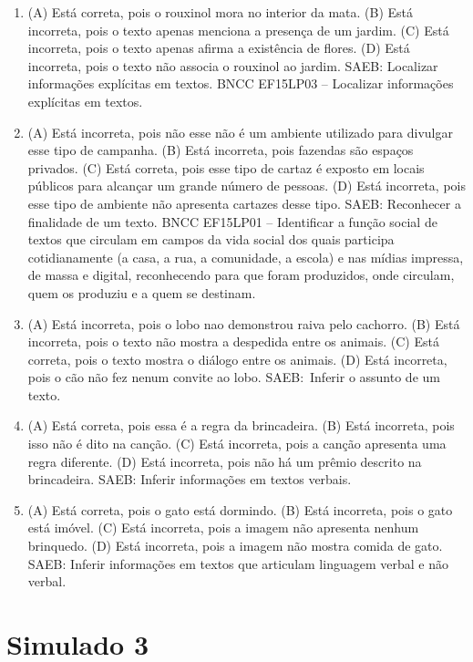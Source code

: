 \begin{enumerate}
\item
(A) Está correta, pois o rouxinol mora no interior da mata.
(B) Está incorreta, pois o texto apenas menciona a presença de um jardim.
(C) Está incorreta, pois o texto apenas afirma a existência de flores.
(D) Está incorreta, pois o texto não associa o rouxinol ao jardim.
SAEB: Localizar informações explícitas em textos.
BNCC EF15LP03 -- Localizar informações explícitas em textos.

\item
(A) Está incorreta, pois não esse não é um ambiente utilizado para divulgar esse tipo de campanha.
(B) Está incorreta, pois fazendas são espaços privados.
(C) Está correta, pois esse tipo de cartaz é exposto em locais
públicos para alcançar um grande número de pessoas.
(D) Está incorreta, pois esse tipo de ambiente não apresenta cartazes desse tipo.
SAEB: Reconhecer a finalidade de um texto.
BNCC EF15LP01 -- Identificar a função social de textos que circulam em
campos da vida social dos quais participa cotidianamente (a casa, a rua,
a comunidade, a escola) e nas mídias impressa, de massa e digital,
reconhecendo para que foram produzidos, onde circulam, quem os produziu
e a quem se destinam.

\item
(A) Está incorreta, pois o lobo nao demonstrou raiva pelo cachorro.
(B) Está incorreta, pois o texto não mostra a despedida entre os animais.
(C) Está correta, pois o texto mostra o diálogo entre os animais.
(D) Está incorreta, pois o cão não fez nenum convite ao lobo.
SAEB:~Inferir o assunto de um texto.

\item
(A) Está correta, pois essa é a regra da brincadeira.
(B) Está incorreta, pois isso não é dito na canção.
(C) Está incorreta, pois a canção apresenta uma regra diferente.
(D) Está incorreta, pois não há um prêmio descrito na brincadeira.
SAEB: Inferir informações em textos verbais.

\item
(A) Está correta, pois o gato está dormindo.
(B) Está incorreta, pois o gato está imóvel.
(C) Está incorreta, pois a imagem não apresenta nenhum brinquedo.
(D) Está incorreta, pois a imagem não mostra comida de gato.
SAEB: Inferir informações em textos que articulam linguagem verbal e não verbal.

\end{enumerate}

\section*{Simulado 3}

